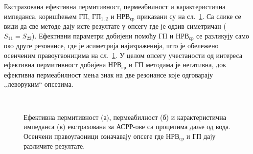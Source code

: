 \documentclass[main.tex]{subfiles}
\begin{document}
Екстрахована ефективна пермитивност, пермеабилност и карактеристична импеданса, коришћењем $ГП$, $ГП_{1,2}$ и $НРВ_{ср}$ приказани су на сл.~\ref{fig10}. Са слике се види да све методе дају исте резултате у опсегу где је одзив симетричан ($S_{11} = S_{22}$). Ефективни параметри добијени помоћу ГП и $НРВ_{ср}$ се разликују само око друге резонансе, где је асиметрија најизраженија, што је обележено осенченим правоугаоницима на сл.~\ref{fig10}. У целом опсегу учестаности од интереса ефективна пермитивност добијена $НРВ_{ср}$ и ГП методама је негативна, док ефективна пермеабилност мења знак на две резонансе које одговарају ,,леворуким`` опсезима.
\begin{figure}[!t]
\centering
{}\hfill
{}\\
\caption{Ефективна пермитивност (а), пермеабилност (б) и карактеристична импеданса (в) екстрахована за АСРР-ове са процепима даље од вода. Осенчени правоугаоници означавају опсеге где $НРВ_{ср}$ и ГП дају различите резултате.}
\label{fig10}
\end{figure} 
\end{document}
